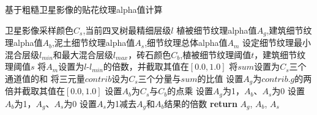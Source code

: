 \begin{algorithm}[h]
	\renewcommand{\algorithmicrequire}{\textbf{Input:}}
	\renewcommand{\algorithmicensure}{\textbf{Output:}}
	\caption{基于粗糙卫星影像的贴花纹理alpha值计算}
	\label{alg:1}
	\begin{algorithmic}[1]
		\REQUIRE 卫星影像采样颜色$C_s$,当前四叉树最精细层级$l$
		\ENSURE 植被细节纹理alpha值$A_g$,建筑细节纹理alpha值$A_b$,泥土细节纹理alpha值$A_s$,细节纹理总体alpha值$A_m$
		\STATE 设定细节纹理最小混合层级$l_{min}$和最大混合层级$l_{max}$，砖石颜色$C_b$,植被细节纹理阈值$t$，建筑细节纹理阈值$s$
		\STATE 将$A_m$设置为$l$-$l_{min}$的倍数，并截取其值在$[0.0,1.0]$
		\STATE 将$sum$设置为$C_s$三个通道值的和
		\STATE 将三元量$contrib$设为$C_s$三个分量与$sum$的比值
		\STATE 设置$A_g$为$contrib.g$的两倍并截取其值在$[0.0,1.0]$
		\STATE 设置$A_b$为$C_s$与$C_b$的点乘
	    \STATE 设置$A_g$为1，$A_b$、$A_s$为0
	    \STATE 设置$A_b$为1，$A_g$、$A_s$为0
	    \ELSE
	    \STATE 设置$A_s$为1减去$A_g$和$A_b$结果的倍数
		\ENDIF
		\STATE \textbf{return} $A_g$, $A_b$, $A_s$
	\end{algorithmic}
\end{algorithm}

